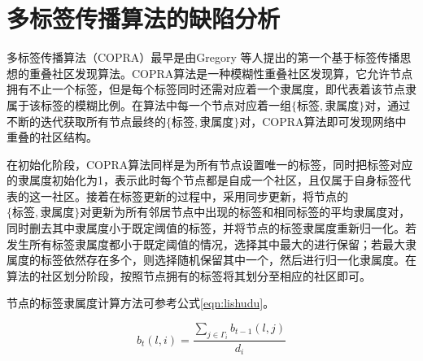 \section{多标签传播算法的缺陷分析}

多标签传播算法（COPRA）\cite{Gregory2009Finding}最早是由Gregory 等人提出的第一个基于标签传播思想的重叠社区发现算法。COPRA算法是一种模糊性重叠社区发现算，它允许节点拥有不止一个标签，但是每个标签同时还需对应着一个隶属度，即代表着该节点隶属于该标签的模糊比例。在算法中每一个节点对应着一组$ \{ 标签,隶属度\} $对，通过不断的迭代获取所有节点最终的$ \{ 标签,隶属度\} $对，COPRA算法即可发现网络中重叠的社区结构。

在初始化阶段，COPRA算法同样是为所有节点设置唯一的标签，同时把标签对应的隶属度初始化为1，表示此时每个节点都是自成一个社区，且仅属于自身标签代表的这一社区。接着在标签更新的过程中，采用同步更新，将节点的$ \{ 标签,隶属度\} $对更新为所有邻居节点中出现的标签和相同标签的平均隶属度对，同时删去其中隶属度小于既定阈值的标签，并将节点的标签隶属度重新归一化。若发生所有标签隶属度都小于既定阈值的情况，选择其中最大的进行保留；若最大隶属度的标签依然存在多个，则选择随机保留其中一个，然后进行归一化隶属度。在算法的社区划分阶段，按照节点拥有的标签将其划分至相应的社区即可。

节点的标签隶属度计算方法可参考公式\ref{eqn:lishudu}。

\begin{equation}
  \label{eqn:lishudu}
  b_t(l,i)=\frac{\sum_{j\in \Gamma_i }b_{t-1}(l,j)}{d_i}
\end{equation}

